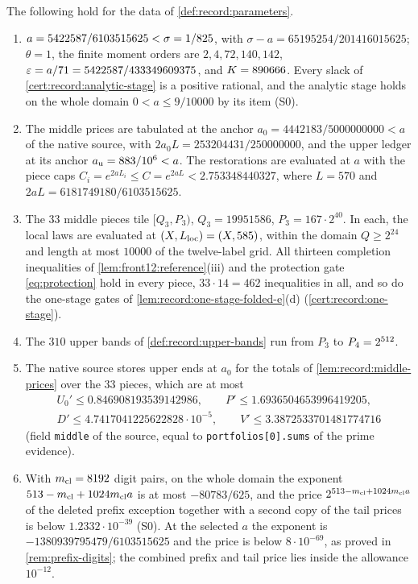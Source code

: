 \begin{certificate}\label{cert:record:frame-data}
The following hold for the data of \cref{def:record:parameters}.
\begin{enumerate}[label=(\alph*)]
\item $a=5422587/6103515625<\sigma=1/825$, with
 $\sigma-a=65195254/201416015625$; $\theta=1$, the finite moment orders
 are $2,4,72,140,142$, $\varepsilon=a/71=5422587/433349609375$, and $K=890666$.
 Every slack of \cref{cert:record:analytic-stage} is a positive rational, and
 the analytic stage holds on the whole domain $0<a\le9/10000$ by its item (S0).
\item The middle prices are tabulated at the anchor $a_0=4442183/5000000000<a$ of the
 native source, with $2a_0L=253204431/250000000$, and the upper ledger at its anchor
 $a_{\rm u}=883/10^6<a$. The restorations are evaluated at $a$ with the piece
 caps $C_i=e^{2aL_i}\le C=e^{2aL}<2.753348440327$, where $L=570$ and
 $2aL=6181749180/6103515625$.
\item The $33$ middle pieces tile $[Q_3,P_3)$, $Q_3=19951586$,
 $P_3=167\cdot2^{40}$. In each, the local laws are evaluated at
 $(X,L_{\rm loc})=(X,585)$, within the domain $Q\ge2^{24}$ and length at most
 $10000$ of the twelve-label grid. All thirteen completion inequalities of
 \cref{lem:front12:reference}(iii) and the protection gate
 \eqref{eq:protection} hold in every piece, $33\cdot14=462$ inequalities in all,
 and so do the one-stage gates of \cref{lem:record:one-stage-folded-e}(d)
 (\cref{cert:record:one-stage}).
\item The $310$ upper bands of \cref{def:record:upper-bands} run from $P_3$ to
 $P_4=2^{512}$.
\item The native source stores upper ends at $a_0$ for the totals of
 \cref{lem:record:middle-prices} over the $33$ pieces, which are at most
 \begin{gather*}
  U_0'\le0.846908193539142986,\qquad P'\le1.6936504653996419205,\\
  D'\le4.7417041225622828\cdot10^{-5},\qquad V'\le3.3872533701481774716
 \end{gather*}
 (field \texttt{middle} of the source, equal to \texttt{portfolios[0].sums} of
 the prime evidence).
\item With $m_{\mathrm{cl}}=8192$ digit pairs, on the whole domain the exponent
 $513-m_{\mathrm{cl}}+1024m_{\mathrm{cl}} a$ is at most $-80783/625$, and the price
 $2^{513-m_{\mathrm{cl}}+1024m_{\mathrm{cl}} a}$ of the deleted prefix exception together with a second
 copy of the tail prices is below $1.2332\cdot10^{-39}$ (S0). At the selected $a$
 the exponent is $-1380939795479/6103515625$ and the price is below
 $8\cdot10^{-69}$, as proved in \cref{rem:prefix-digits}; the combined
 prefix and tail price lies inside the allowance $10^{-12}$.
\end{enumerate}
\end{certificate}

